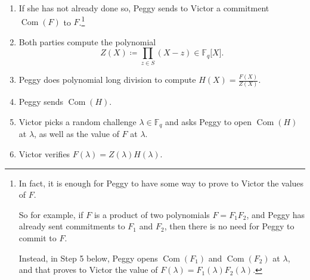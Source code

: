 \begin{enumerate}
\item
  If she has not already done so, Peggy sends to Victor a commitment
  \(\operatorname{Com}(F)\) to \(F\).\footnote{In fact, it is enough for
    Peggy to have some way to prove to Victor the values of \(F\).

    So for example, if \(F\) is a product of two polynomials
    \(F = F_{1}F_{2}\), and Peggy has already sent commitments to
    \(F_{1}\) and \(F_{2}\), then there is no need for Peggy to commit
    to \(F\).

    Instead, in Step 5 below, Peggy opens \(\operatorname{Com}(F_{1})\)
    and \(\operatorname{Com}(F_{2})\) at \(\lambda\), and that proves to
    Victor the value of \(F(\lambda) = F_{1}(\lambda)F_{2}(\lambda)\).}
\item
  Both parties compute the polynomial
  \[Z(X) ≔ \prod_{z \in S}(X - z) \in {\mathbb{F}}_{q}\lbrack X\rbrack.\]
\item
  Peggy does polynomial long division to compute
  \(H(X) = \frac{F(X)}{Z(X)}\).
\item
  Peggy sends \(\operatorname{Com}(H)\).
\item
  Victor picks a random challenge \(\lambda \in {\mathbb{F}}_{q}\) and
  asks Peggy to open \(\operatorname{Com}(H)\) at \(\lambda\), as well
  as the value of \(F\) at \(\lambda\).
\item
  Victor verifies \(F(\lambda) = Z(\lambda)H(\lambda)\).
\end{enumerate}

\label{root-check}{}
